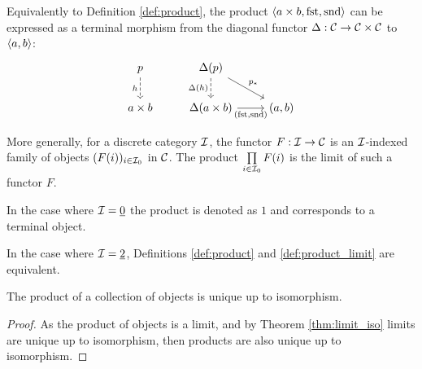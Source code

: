 \begin{definition}
	Equivalently to Definition \ref{def:product}, the product $\langle a\times b,
	\mathrm{fst}, \mathrm{snd}\rangle$ can be expressed as a terminal morphism from the diagonal functor $\Delta: \mathcal{C} \to \mathcal{C}\times \mathcal{C}$ to $\langle a, b\rangle$:
	\[\begin{tikzcd}[ampersand replacement=\&]
		p \& {\Delta(p)} \\
		{a\times b} \& {\Delta(a\times b)} \& {(a,b)}
		\arrow["h"', dashed, from=1-1, to=2-1]
		\arrow["{\Delta(h)}"', dashed, from=1-2, to=2-2]
		\arrow["{p_*}", from=1-2, to=2-3]
		\arrow["{(\mathrm{fst}, \mathrm{snd})}"', from=2-2, to=2-3]
	\end{tikzcd}\]

\end{definition}

\begin{definition}

	More generally, for a discrete category $\mathcal{I}$, the functor $F:\mathcal{I}\to \mathcal{C}$ is an
	$\mathcal{I}$-indexed family of objects $(F(i))_{i\in \mathcal{I}_0}$ in $\mathcal{C}$. The product
	$\prod\limits_{i\in \mathcal{I}_0} F(i)$ is the limit of such a functor $F$.
	\parencite{leinster:basic_category_theory}
\end{definition}

\begin{remark}
	In the case where $\mathcal{I}=\underline{0}$ the product is denoted as $1$ and
	corresponds to a terminal object.
\end{remark}

\begin{remark}
	In the case where $\mathcal{I}=\underline{2}$, Definitions \ref{def:product} and
	\ref{def:product_limit} are equivalent.
\end{remark}

\begin{theorem}
	The product of a collection of objects is unique up to isomorphism.

	\begin{proof}
		As the product of objects is a limit, and by Theorem \ref{thm:limit_iso}
		limits are unique up to isomorphism, then products are also unique up to
		isomorphism.
	\end{proof}
\end{theorem}

